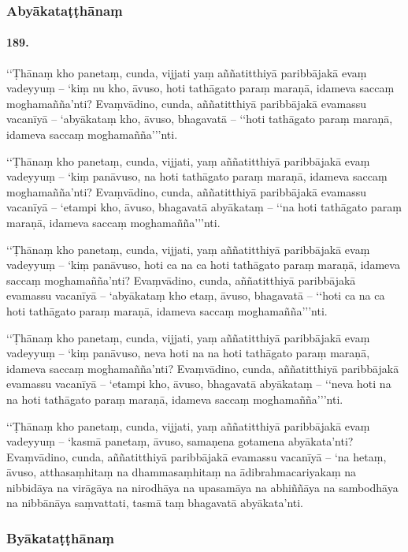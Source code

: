 \subsubsection{Abyākataṭṭhānaṃ}

\paragraph{189.} ‘‘Ṭhānaṃ kho panetaṃ, cunda, vijjati yaṃ aññatitthiyā paribbājakā evaṃ vadeyyuṃ – ‘kiṃ nu kho, āvuso, hoti tathāgato paraṃ maraṇā, idameva saccaṃ moghamañña’nti? Evaṃvādino, cunda, aññatitthiyā paribbājakā evamassu vacanīyā – ‘abyākataṃ kho, āvuso, bhagavatā – ‘‘hoti tathāgato paraṃ maraṇā, idameva saccaṃ moghamañña’’’nti.

‘‘Ṭhānaṃ kho panetaṃ, cunda, vijjati, yaṃ aññatitthiyā paribbājakā evaṃ vadeyyuṃ – ‘kiṃ panāvuso, na hoti tathāgato paraṃ maraṇā, idameva saccaṃ moghamañña’nti? Evaṃvādino, cunda, aññatitthiyā paribbājakā evamassu vacanīyā – ‘etampi kho, āvuso, bhagavatā abyākataṃ – ‘‘na hoti tathāgato paraṃ maraṇā, idameva saccaṃ moghamañña’’’nti.

‘‘Ṭhānaṃ kho panetaṃ, cunda, vijjati, yaṃ aññatitthiyā paribbājakā evaṃ vadeyyuṃ – ‘kiṃ panāvuso, hoti ca na ca hoti tathāgato paraṃ maraṇā, idameva saccaṃ moghamañña’nti? Evaṃvādino, cunda, aññatitthiyā paribbājakā evamassu vacanīyā – ‘abyākataṃ kho etaṃ, āvuso, bhagavatā – ‘‘hoti ca na ca hoti tathāgato paraṃ maraṇā, idameva saccaṃ moghamañña’’’nti.

‘‘Ṭhānaṃ kho panetaṃ, cunda, vijjati, yaṃ aññatitthiyā paribbājakā evaṃ vadeyyuṃ – ‘kiṃ panāvuso, neva hoti na na hoti tathāgato paraṃ maraṇā, idameva saccaṃ moghamañña’nti? Evaṃvādino, cunda, aññatitthiyā paribbājakā evamassu vacanīyā – ‘etampi kho, āvuso, bhagavatā abyākataṃ – ‘‘neva hoti na na hoti tathāgato paraṃ maraṇā, idameva saccaṃ moghamañña’’’nti.

‘‘Ṭhānaṃ kho panetaṃ, cunda, vijjati, yaṃ aññatitthiyā paribbājakā evaṃ vadeyyuṃ – ‘kasmā panetaṃ, āvuso, samaṇena gotamena abyākata’nti? Evaṃvādino, cunda, aññatitthiyā paribbājakā evamassu vacanīyā – ‘na hetaṃ, āvuso, atthasaṃhitaṃ na dhammasaṃhitaṃ na ādibrahmacariyakaṃ na nibbidāya na virāgāya na nirodhāya na upasamāya na abhiññāya na sambodhāya na nibbānāya saṃvattati, tasmā taṃ bhagavatā abyākata’nti.

\subsubsection{Byākataṭṭhānaṃ}

